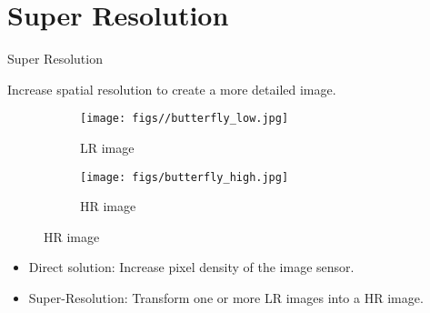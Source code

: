 \section{Super Resolution}
\begin{frame}{Super Resolution}{}
    \begin{block}{Increase spatial resolution to create a more detailed image.}

        \begin{figure}[H]
            \centering
            \begin{subfigure}[b]{0.25\textwidth}
                \texttt{[image: figs//butterfly\_low.jpg]}
                \caption*{\scriptsize LR image}
            \end{subfigure}
            \quad
            \begin{subfigure}[b]{0.25\textwidth}
                \texttt{[image: figs/butterfly\_high.jpg]}
                \caption*{\scriptsize HR image}
            \end{subfigure}
        \end{figure}

        \begin{itemize}
            \item Direct solution: Increase pixel density of the image sensor.
            \item Super-Resolution: Transform one or more LR images into a HR image.
        \end{itemize}


    \end{block}
\end{frame}




